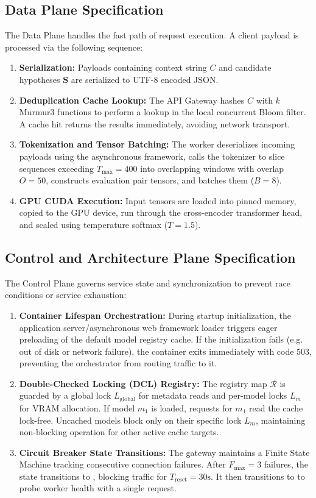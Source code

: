 \documentclass[11pt,a4paper]{article}
\theoremstyle{plain}
\theoremstyle{definition}
\theoremstyle{remark}
\newcommand{\Lm}{L_m}
\newcommand{\Lg}{L_{\mathrm{global}}}
\begin{document}
\subsection{Data Plane Specification}
The Data Plane handles the fast path of request execution. A client payload is processed via the following sequence:
\begin{enumerate}
    \item \textbf{Serialization:} Payloads containing context string $C$ and candidate hypotheses $\mathbf{S}$ are serialized to UTF-8 encoded JSON.
    \item \textbf{Deduplication Cache Lookup:} The API Gateway hashes $C$ with $k$ Murmur3 functions to perform a lookup in the local concurrent Bloom filter. A cache hit returns the results immediately, avoiding network transport.
    \item \textbf{Tokenization and Tensor Batching:} The worker deserializes incoming payloads using the asynchronous framework, calls the tokenizer to slice sequences exceeding $T_{\max} = 400$ into overlapping windows with overlap $O=50$, constructs evaluation pair tensors, and batches them ($B=8$).
    \item \textbf{GPU CUDA Execution:} Input tensors are loaded into pinned memory, copied to the GPU device, run through the cross-encoder transformer head, and scaled using temperature softmax ($T=1.5$).
\end{enumerate}

\subsection{Control and Architecture Plane Specification}
The Control Plane governs service state and synchronization to prevent race conditions or service exhaustion:
\begin{enumerate}
    \item \textbf{Container Lifespan Orchestration:} During startup initialization, the application server/asynchronous web framework loader triggers eager preloading of the default model registry cache. If the initialization fails (e.g. out of disk or network failure), the container exits immediately with code 503, preventing the orchestrator from routing traffic to it.
    \item \textbf{Double-Checked Locking (DCL) Registry:} The registry map $\mathcal{R}$ is guarded by a global lock $\Lg$ for metadata reads and per-model locks $\Lm$ for VRAM allocation. If model $m_1$ is loaded, requests for $m_1$ read the cache lock-free. Uncached models block only on their specific lock $\Lm$, maintaining non-blocking operation for other active cache targets.
    \item \textbf{Circuit Breaker State Transitions:} The gateway maintains a Finite State Machine tracking consecutive connection failures. After $F_{\max}=3$ failures, the state transitions to , blocking traffic for $T_{\text{reset}}=30\text{s}$. It then transitions to  to probe worker health with a single request.
\end{enumerate}
\end{document}
